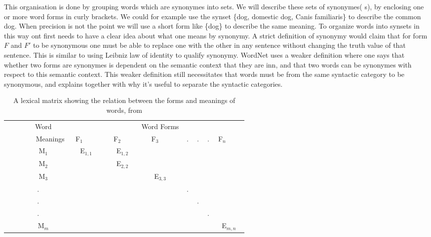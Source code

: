 This organisation is done by grouping words which are synonymes into sets. 
We will describe these sets of synonymes( s), by enclosing one or more word forms in curly brackets.
We could for example use the synset \{dog, domestic dog, Canis familiaris\} to describe the common dog. 
When precision is not the point we will use a short form like \{dog\} to describe the same meaning.
To organize words into synsets in this way ont first needs to have a clear idea about what one means by synonymy.
A strict definition of synonymy would claim that for form $F$ and $F'$ to be synonymous one must be able
to replace one with the other in any sentence without changing the truth value of that sentence.
This is similar to using Leibniz law of identity to qualify synonymy.
WordNet uses a weaker definition where one says that whether two forms are synonymes is dependent on the 
semantic context that they are inn, and that two words can be synonymes with respect to this semantic context\citep{Miller1990}.
This weaker definition still necessitates that words must be from the same syntactic category to be synonymous, 
and explains together with \citet{Fillenbaum1965} why it's useful to separate the syntactic categories.

\begin{table}[h]
	\centering
	\begin{tabular}{|c||ccccccc|}
		\hline
	        Word     & 	~		 & ~		 & Word Forms & ~ & ~ & ~ & ~		  \\ 
	        Meanings & F$_1$     & F$_2$     & F$_3$      & . & . & . & F$_n$     \\ \hline
	        M$_1$    & E$_{1,1}$ & E$_{1,2}$ & ~          & ~ & ~ & ~ & ~         \\ 
	        M$_2$    & ~         & E$_{2,2}$ & ~          & ~ & ~ & ~ & ~         \\ 
	        M$_3$    & ~         & ~         & E$_{3,3}$  & ~ & ~ & ~ & ~         \\ 
	        .        & ~         & ~         & ~          & . & ~ & ~ & ~         \\ 
	        .        & ~         & ~         & ~          & ~ & . & ~ & ~         \\ 
	        .        & ~         & ~         & ~          & ~ & ~ & . & ~         \\ 
	        M$_m$    & ~         & ~         & ~          & ~ & ~ & ~ & E$_{m,n}$ \\
		\hline
	\end{tabular}
	\caption{A lexical matrix showing the relation between the forms and meanings of words, from \citet{Miller1990}}
	\label{table:LexicalMatrix}
\end{table}

